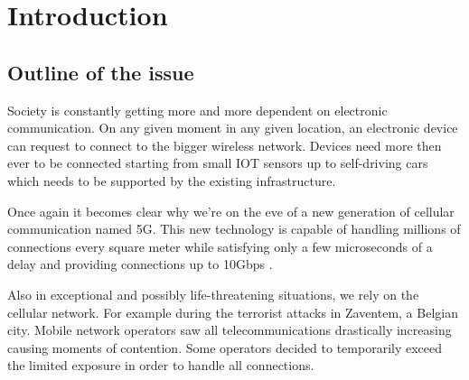%

\chapter{Introduction}
\label{chap:intro}

\section{Outline of the issue} %
\label{sec:issue}



Society is constantly getting more and more dependent on electronic communication. On any given moment in any given location, an electronic device
can request to connect to the bigger wireless network. Devices need more then ever to be connected starting from small IOT sensors up to self-driving cars
which needs to be supported by the existing infrastructure. 

Once again it becomes clear why we're on the eve of a new generation of cellular communication named 5G. 
This new technology is capable of handling millions of connections every square meter %
while satisfying only a few microseconds of a delay and providing connections up to 10Gbps \cite{5GFeatures}.

Also in exceptional and possibly life-threatening situations, we rely on the cellular network. For example during the terrorist attacks in Zaventem, a Belgian city.
Mobile network operators saw all telecommunications drastically increasing causing moments of contention. Some operators decided to temporarily exceed the limited exposure in
order to handle all connections. \cite{baseZaventem}


